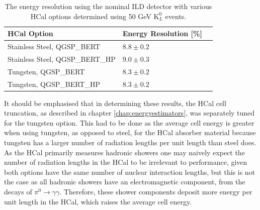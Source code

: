 \begin{table}[h!]
\centering
\begin{tabular}{ l l l }
\hline
HCal Option & Energy Resolution [\%] \\
\hline
Stainless Steel, QGSP\_BERT & $8.8\pm0.2$ \\
Stainless Steel, QGSP\_BERT\_HP & $9.0\pm0.3$ \\
Tungsten, QGSP\_BERT & $8.3\pm0.2$ \\
Tungsten, QGSP\_BERT\_HP & $8.3\pm0.2$ \\
\hline
\end{tabular}
\caption[The energy resolution using the nominal ILD detector with various HCal options determined using 50 GeV $\text{K}^{0}_{L}$ events.]{The energy resolution using the nominal ILD detector with various HCal options determined using 50 GeV $\text{K}^{0}_{L}$ events.}
\label{table:erhcalabsmaterial}
\end{table}

It should be emphasised that in determining these results, the HCal cell truncation, as described in chapter \ref{chap:energyestimators}, was separately tuned for the tungsten option.  This had to be done as the average cell energy is greater when using tungsten, as opposed to steel, for the HCal absorber material because tungsten has a larger number of radiation lengths per unit length than steel does.  As the HCal primarily measures hadronic showers one may naively expect the number of radiation lengths in the HCal to be irrelevant to performance, given both options have the same number of nuclear interaction lengths, but this is not the case as all hadronic showers have an electromagnetic component, from the decays of $\pi^{0}\rightarrow \gamma \gamma$.  Therefore, these shower components deposit more energy per unit length in the HCal, which raises the average cell energy.  

